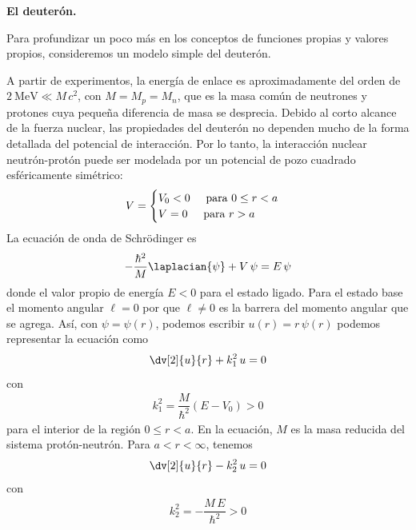 \newpage
\begin{ejemplo}{\textbf{El deuterón.}}

Para profundizar un poco más en los conceptos de funciones propias y valores propios, consideremos un modelo simple del deuterón.
\par
A partir de experimentos, la energía de enlace es aproximadamente del orden de $\SI{2}{\mega \electronvolt} \ll M \, c^{2} $, con $M = M_{p} = M_{n}$, que es la masa común de neutrones y protones cuya pequeña diferencia de masa se desprecia. Debido al corto alcance de la fuerza nuclear, las propiedades del deuterón no dependen mucho de la forma detallada del potencial de interacción. Por lo tanto, la interacción nuclear neutrón-protón puede ser modelada por un potencial de pozo cuadrado esféricamente simétrico: 
\begin{align}
V = \begin{cases}
V_{0} < 0 \hspace{0.5cm} \text{para } 0 \leq r < a \\
V = 0 \hspace{0.5cm} \text{para } r > a
\end{cases}
\end{align}
La ecuación de onda de Schrödinger es
\begin{align}
- \dfrac{\hbar^{2}}{M} \laplacian{\psi} + V \, \psi =  E \, \psi
\label{eq:ecuacion_10_10}
\end{align}
donde el valor propio de energía $E < 0$ para el estado ligado. Para el estado base el momento angular $ \ell = 0$ por que $\ell \neq 0$ es la barrera del momento angular que se agrega. Así, con $\psi =  \psi(r)$, podemos escribir $u(r) = r \, \psi (r)$ podemos representar la ecuación como
\begin{align}
\dv[2]{u}{r} + k_{1}^{2} \, u = 0
\label{eq:ecuacion_10_11}
\end{align}
con
\begin{align}
k_{1}^{2} =  \dfrac{M}{\hbar^{2}} (E - V_{0}) > 0
\label{eq:ecuacion_10_12}
\end{align}
para el interior de la región $0 \leq r < a$. En la ecuación, $M$ es la masa reducida del sistema protón-neutrón. Para $a < r < \infty$, tenemos
\begin{align}
\dv[2]{u}{r} - k_{2}^{2} \, u = 0
\label{eq:ecuacion_10_13}
\end{align}
con
\begin{align}
k_{2}^{2} = - \dfrac{M \, E}{\hbar^{2}} > 0
\label{eq:ecuacion_10_14}
\end{align}

\end{ejemplo}
